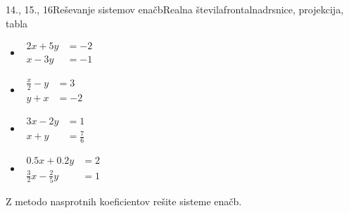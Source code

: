 \begin{priprava}{14., 15., 16}{}{Reševanje sistemov enačb}{Realna števila}{frontalna}{drsnice, projekcija, tabla}
\begin{naloga}
\begin{multicols}{2}
                \begin{itemize}
                    
                        \item $\begin{aligned}
                            2x+5y&=-2 \\ x-3y&=-1
                        \end{aligned}$ 
                        \item $\begin{aligned}
                            \frac{x}{2}-y&=3 \\ y+x&=-2
                        \end{aligned}$ 
                        \item $\begin{aligned}
                            3x-2y&=1 \\ x+y&=\frac{7}{6}
                        \end{aligned}$ 
                        \item $\begin{aligned}
                            0.5x+0.2y&=2 \\ \frac{3}{2}x-\frac{2}{5}y&=1
                        \end{aligned}$ 
                    

                \end{itemize}
            \end{multicols}

            \end{naloga}
        


        
            \begin{naloga}
                Z metodo nasprotnih koeficientov rešite sisteme enačb.
                \begin{multicols}{2}
                    
                    \begin{itemize}
                    

\end{itemize}
\end{multicols}
\end{naloga}
\end{priprava}
